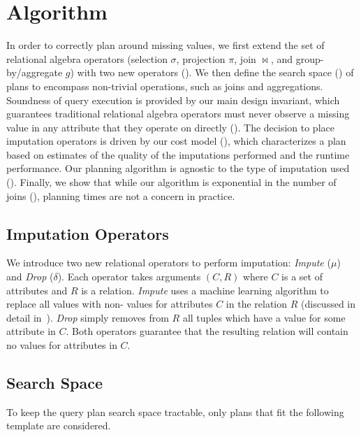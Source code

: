 \section{Algorithm}
In order to correctly plan around missing values, we first extend the set of relational algebra operators (selection $\sigma$, projection $\pi$, join $\bowtie$, and group-by/aggregate $g$) 
with two new operators (). We then define the search space () of plans to encompass non-trivial operations, such as joins and 
aggregations. Soundness of query execution is provided by our main design invariant, which guarantees traditional relational
algebra operators must never observe a missing value in any attribute that they operate on directly (). 
The decision to place imputation operators is driven by our cost model (), which characterizes a plan based on estimates of the 
quality of the imputations performed and the runtime performance. Our planning algorithm is
agnostic to the type of imputation used ().
Finally, we show that while our algorithm is exponential in the number of joins (), planning times are not a concern in practice.


\subsection{Imputation Operators}
\label{sec:operators}
We introduce two new relational operators to perform imputation: \textit{Impute} ($\mu$) and
\textit{Drop} ($\delta$). Each operator takes arguments $(C, R)$ where $C$ is a set of
attributes and $R$ is a relation. \textit{Impute} uses a machine learning algorithm to
replace all \nullv{} values with non-\nullv{} values for attributes $C$ in the relation $R$ (discussed in detail in~).
\textit{Drop} simply removes from $R$ all tuples which have a \nullv{} value for some attribute in $C$.
Both operators guarantee that the resulting relation will contain no \nullv{} values for
attributes in $C$.  

\subsection{Search Space}
\label{sec:search-space}
To keep the query plan search space tractable, only plans that fit the following template are considered.

